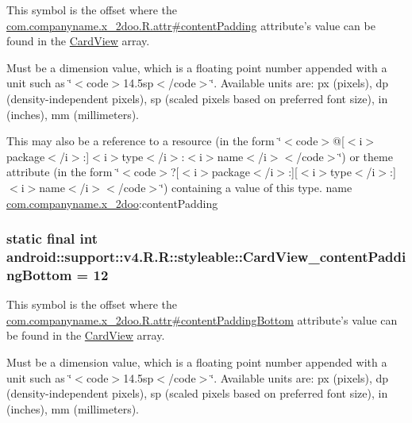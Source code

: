 This symbol is the offset where the \hyperlink{classcom_1_1companyname_1_1x__2doo_1_1_r_1_1attr_7764b1e257d6d500ac29087f6a69cdba}{com.companyname.x\_\-2doo.R.attr\#contentPadding} attribute's value can be found in the \hyperlink{classandroid_1_1support_1_1v4_1_1_r_1_1styleable_4fcc6453aa91deadd7072add3aee5e56}{CardView} array.

Must be a dimension value, which is a floating point number appended with a unit such as \char`\"{}$<$code$>$14.5sp$<$/code$>$\char`\"{}. Available units are: px (pixels), dp (density-independent pixels), sp (scaled pixels based on preferred font size), in (inches), mm (millimeters). 

This may also be a reference to a resource (in the form \char`\"{}$<$code$>$@\mbox{[}$<$i$>$package$<$/i$>$:\mbox{]}$<$i$>$type$<$/i$>$:$<$i$>$name$<$/i$>$$<$/code$>$\char`\"{}) or theme attribute (in the form \char`\"{}$<$code$>$?\mbox{[}$<$i$>$package$<$/i$>$:\mbox{]}\mbox{[}$<$i$>$type$<$/i$>$:\mbox{]}$<$i$>$name$<$/i$>$$<$/code$>$\char`\"{}) containing a value of this type.  name \hyperlink{namespacecom_1_1companyname_1_1x__2doo}{com.companyname.x\_\-2doo}:contentPadding \hypertarget{classandroid_1_1support_1_1v4_1_1_r_1_1styleable_a790a1e2e5bcbfb64d641cb1be13698d}{
\subsubsection[{CardView\_\-contentPaddingBottom}]{\setlength{\rightskip}{0pt plus 5cm}static final int android::support::v4.R.R::styleable::CardView\_\-contentPaddingBottom = 12}}
\label{classandroid_1_1support_1_1v4_1_1_r_1_1styleable_a790a1e2e5bcbfb64d641cb1be13698d}


This symbol is the offset where the \hyperlink{classcom_1_1companyname_1_1x__2doo_1_1_r_1_1attr_e0860be18c327cbdf719349cd1c2a8dd}{com.companyname.x\_\-2doo.R.attr\#contentPaddingBottom} attribute's value can be found in the \hyperlink{classandroid_1_1support_1_1v4_1_1_r_1_1styleable_4fcc6453aa91deadd7072add3aee5e56}{CardView} array.

Must be a dimension value, which is a floating point number appended with a unit such as \char`\"{}$<$code$>$14.5sp$<$/code$>$\char`\"{}. Available units are: px (pixels), dp (density-independent pixels), sp (scaled pixels based on preferred font size), in (inches), mm (millimeters). 

